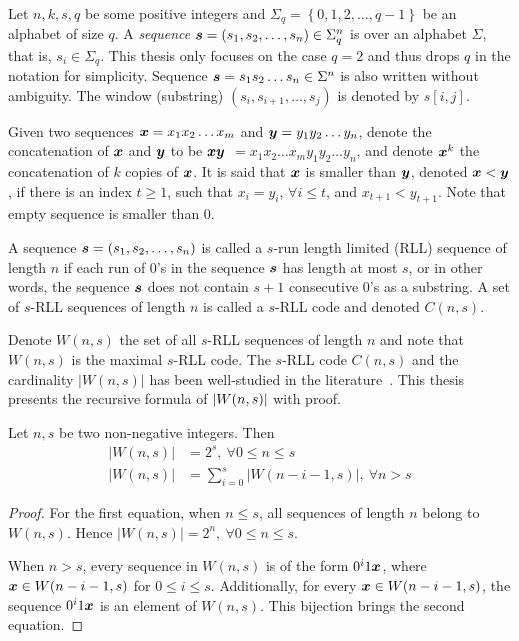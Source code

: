 Let $n,k,s,q$ be some positive integers and $\Sigma_{q} = \left\{0,1,2,\ldots,q-1\right\}$ be an alphabet of size $q$. A \emph{sequence} ${\boldsymbol s}=\left(s_{1},s_{2},\ldots,s_{n}\right)\in\Sigma^{n}_{q}$ is over an alphabet $\Sigma$, that is, $s_{i}\in\Sigma_{q}$. This thesis only focuses on the case $q=2$ and thus drops $q$ in the notation for simplicity. Sequence ${\boldsymbol s}=s_{1}s_{2}\ldots s_{n}\in\Sigma^{n}$ is also written without ambiguity. The window (substring) $(s_{i},s_{i+1},\ldots,s_{j})$ is denoted by $s[i,j]$. 

Given two sequences ${\boldsymbol x}=x_{1}x_{2}\ldots x_{m}$ and ${\boldsymbol y}=y_{1}y_{2}\ldots y_{n}$, denote the concatenation of ${\boldsymbol x}$ and ${\boldsymbol y}$ to be ${\boldsymbol x}{\boldsymbol y} $ $=x_{1}x_{2}\ldots x_{m}y_{1}y_{2}\ldots y_{n}$, and denote ${\boldsymbol x}^{k}$ the concatenation of $k$ copies of ${\boldsymbol x}$. It is said that ${\boldsymbol x}$ is smaller than ${\boldsymbol y}$, denoted ${\boldsymbol x}<{\boldsymbol y}$, if there is an index $t\geq1$, such that $x_{i}=y_{i}$, $\forall i\leq t$, and $x_{t+1}<y_{t+1}$. Note that empty sequence is smaller than $0$.

\begin{definition}
    A  sequence ${\boldsymbol s} = (s_1,s_2,\ldots,s_n)$ is called a $s$-run length limited (RLL) sequence of length $n$ if each run of 0's in the sequence ${\boldsymbol s}$ has length at most $s$, or in other words, the sequence ${\boldsymbol s}$ does not contain $s+1$ consecutive 0's as a substring. 
A set of $s$-RLL sequences of length $n$ is called a $s$-RLL code and denoted $C(n,s)$.
\end{definition}

Denote $W(n,s)$ the set of all $s$-RLL sequences of length $n$ and note that $W(n,s)$ is the maximal $s$-RLL code. The $s$-RLL code $C(n,s)$ and the cardinality $|W(n,s)|$ has been well-studied in the literature~\cite{blake1982enumeration, kurmaev2011constant}. This thesis presents the recursive formula of $\left \lvert W(n,s) \right \rvert$ with proof.

\begin{lemma}[Cardinality of $W(n,s)$]\label{lem:card_W}
    Let $n,s$ be two non-negative integers. Then
    \begin{align*}
        \lvert W(n,s) \rvert &= 2^{s},\ \forall 0\leq n\leq s \\
        \lvert W(n,s) \rvert &= \sum_{i=0}^{s} \lvert W(n-i-1,s)\rvert,\ \forall n>s
    \end{align*}
\end{lemma}
\begin{proof}
    For the first equation, when $n\leq s$, all sequences of length $n$ belong to $W(n,s)$. Hence $\lvert W(n,s) \rvert = 2^{n},\ \forall 0\leq n\leq s$. 
    
    When $n>s$, every sequence in $W(n,s)$ is of the form $0^{i}1{\boldsymbol x}$, where ${\boldsymbol x} \in W(n-i-1,s)$ for $0 \leq i \leq s$. Additionally, for every ${\boldsymbol x}\in W(n-i-1,s)$, the sequence $0^{i}1{\boldsymbol x}$ is an element of $W(n,s)$. This bijection brings the second equation.
\end{proof}

